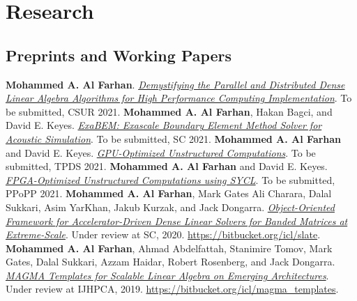 \documentclass[10pt,a4paper]{moderncv}
\begin{document}
{{\section{Research}
{
  \subsection{Preprints and Working Papers}

  \cvitem{[1]}
  {
  \textbf{Mohammed A. Al Farhan}.
  \href{}
  {\textit{Demystifying the Parallel and Distributed Dense Linear Algebra
  Algorithms for High Performance Computing Implementation}}. To be submitted, CSUR 2021.
  }
  \cvitem{[2]}
  {
    \textbf{Mohammed A. Al Farhan},
    Hakan Bagci, and David E. Keyes.
    \href{}
    {\textit{ExaBEM: Exascale Boundary Element Method Solver for Acoustic Simulation}}.
    To be submitted, SC 2021.%
  }
  \cvitem{[3]}
  {
    \textbf{Mohammed A. Al Farhan} and David E. Keyes.
    \href{}
    {\textit{GPU-Optimized Unstructured Computations}}.
    To be submitted, TPDS 2021. %
  }
  \cvitem{[4]}
  {
    \textbf{Mohammed A. Al Farhan} and David E. Keyes.
    \href{}
    {\textit{FPGA-Optimized Unstructured Computations using SYCL}}.
    To be submitted, PPoPP 2021. %
  }
  \cvitem{[5]}
  {
    \textbf{Mohammed A. Al Farhan}, Mark Gates
    Ali Charara, Dalal Sukkari, Asim YarKhan,
    Jakub Kurzak, and Jack Dongarra.
    \href{}
    {\textit{
        Object-Oriented Framework for Accelerator-Driven Dense Linear Solvers
        for Banded Matrices at Extreme-Scale}}.
        Under review at SC, 2020.
    \newline
    \url{https://bitbucket.org/icl/slate}.
  }
  \cvitem{[6]}
  {
    \textbf{Mohammed A. Al Farhan},
    Ahmad Abdelfattah, Stanimire Tomov, Mark Gates,
    Dalal Sukkari, Azzam Haidar, Robert Rosenberg, and Jack Dongarra.
    \href{}
    {\textit{MAGMA Templates for Scalable Linear Algebra on Emerging
    Architectures}}.
    Under review at IJHPCA, 2019.
    \newline
    \url{https://bitbucket.org/icl/magma_templates}.
  }

}}}
\end{document}
